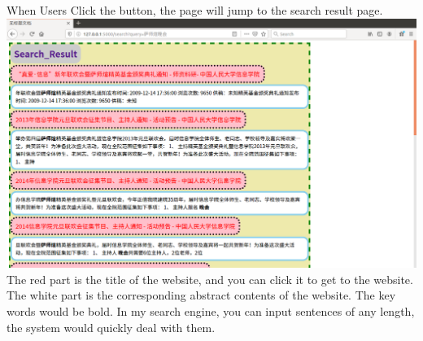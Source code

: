 \documentclass{article}
\begin{document}
When Users Click the button, the page will jump to the search result page. \\ 
\includegraphics[width=1\textwidth]{result} \\
The red part is the title of the website, and you can click it to get to the website. The white part is the corresponding abstract contents of the website. The key words would be bold. In my search engine, you can input sentences of any length, the system would quickly deal with them.
\end{document}
